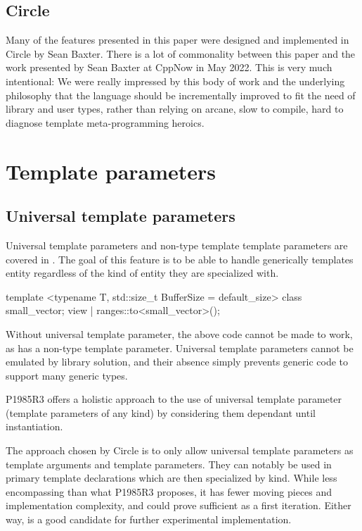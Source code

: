 \documentclass{wg21}
\begin{document}
\subsection{Circle}

Many of the features presented in this paper were designed and implemented in Circle by Sean Baxter.
There is a lot of commonality between this paper and the work presented by Sean Baxter at CppNow in May 2022.
This is very much intentional: We were really impressed by this body of work and the underlying philosophy that the language should be incrementally improved
to fit the need of library and user types, rather than relying on arcane, slow to compile, hard to diagnose template meta-programming heroics.


\section{Template parameters}

\subsection{Universal template parameters}

Universal template parameters and non-type template template parameters are covered in
.
The goal of this feature is to be able to handle generically templates entity regardless of the kind of entity
they are specialized with.

\begin{colorblock}
template <typename T, std::size_t BufferSize = default_size>
class small_vector;
view | ranges::to<small_vector>();
\end{colorblock}

Without universal template parameter, the above code cannot be made to work,
as  has a non-type template parameter.
Universal template parameters cannot be emulated by library solution, and their absence simply prevents
generic code to support many generic types.

P1985R3 offers a holistic approach to the use of universal template parameter (template parameters of any kind)
by considering them dependant until instantiation.

The approach chosen by Circle is to only allow universal template parameters as template arguments and template parameters. They can notably be used in primary template declarations which are then specialized by kind.
While less encompassing than what P1985R3 proposes, it has fewer moving pieces and implementation complexity, and could
prove sufficient as a first iteration.
Either way,  is a good candidate for further experimental implementation.
\end{document}
